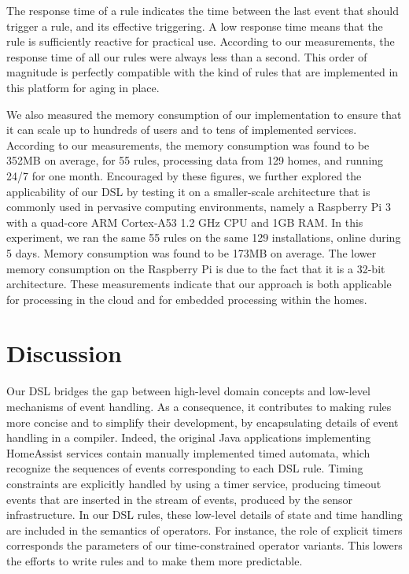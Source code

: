 The response time of a rule indicates the time between the last event that should trigger a rule, and its effective triggering. A low response time means that the rule is sufficiently reactive for practical use. According to our measurements, the response time of all our rules were always less than a second. This order of magnitude is perfectly compatible with the kind of rules that are implemented in this platform for aging in place.

We also measured the memory consumption of our implementation to ensure that it can scale up to hundreds of users and to tens of implemented services. According to our measurements, the memory consumption was found to be 352MB on average, for 55 rules, processing data from 129 homes, and running 24/7 for one month. Encouraged by these figures, we further explored the applicability of our DSL by testing it on a smaller-scale architecture that is commonly used in pervasive computing environments, namely a Raspberry Pi 3 with a quad-core ARM Cortex-A53 1.2 GHz CPU and 1GB RAM. In this experiment, we ran the same 55 rules on the same 129 installations, online during 5 days. Memory consumption was found to be 173MB on average. 
The lower memory consumption on the Raspberry Pi is due to the fact that it is a 32-bit architecture.
These measurements indicate that our approach is both applicable for processing in the cloud 
and for embedded processing within the homes.

\section{Discussion}

Our DSL bridges the gap between high-level domain concepts and low-level mechanisms of event handling. As a consequence, it contributes to making rules more concise and  to simplify their development, by encapsulating details of event handling in a compiler.  Indeed, the original Java applications implementing HomeAssist services contain manually implemented timed automata, which recognize the sequences of events corresponding to each DSL rule.  Timing constraints are explicitly handled by using a timer service, producing timeout events that are inserted in the stream of events, produced by the sensor infrastructure.  In our DSL rules, these low-level details of state and time handling are included in the semantics of operators.  For instance, the role of explicit timers corresponds the parameters of our time-constrained operator variants. This lowers the efforts to write rules and to make them more predictable.

